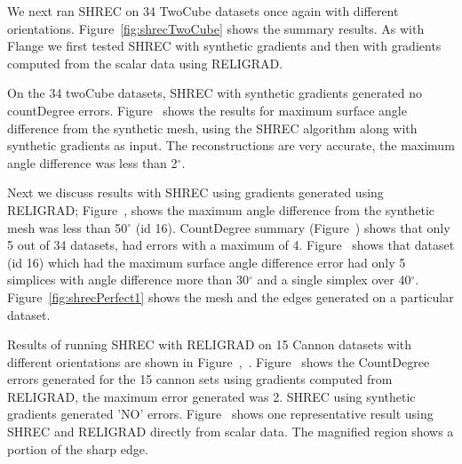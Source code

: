 We next ran SHREC on 34 TwoCube datasets once again with different orientations. Figure~\ref{fig:shrecTwoCube} shows the summary results. As with Flange we first tested SHREC with synthetic gradients and then with gradients computed from the scalar data using RELIGRAD.

On the 34 twoCube datasets, SHREC with synthetic gradients generated no countDegree errors. 
Figure~\protect{} shows the results for maximum surface angle difference from the synthetic mesh, using the SHREC algorithm along with synthetic gradients as input. The reconstructions are very accurate, the maximum angle difference was less than 2$^{\circ}$. 

Next we discuss results with SHREC using gradients generated using RELIGRAD;
Figure~\protect{}, shows the maximum angle difference from the synthetic mesh was less than 50$^\circ$ (id 16). CountDegree summary (Figure~\protect{}) shows that only 5 out of 34 datasets, had errors with a maximum of 4. Figure~\protect{} shows that dataset (id 16) which had the maximum surface angle difference error had only 5 simplices with angle difference more than 30$^\circ$ and a single simplex over 40$^\circ$.
Figure~\ref{fig:shrecPerfect1} shows the mesh and the edges generated on a particular dataset.

Results of running SHREC with RELIGRAD on 15 Cannon datasets  with different orientations are shown in Figure~\protect{},~\protect{}. Figure~\protect{} shows the CountDegree errors generated for the 15 cannon sets using gradients computed from RELIGRAD, the maximum error generated was 2. SHREC using synthetic gradients generated 'NO' errors. Figure~\protect{} shows one representative result using SHREC and RELIGRAD directly from scalar data. The magnified region shows a portion of the sharp edge. 

